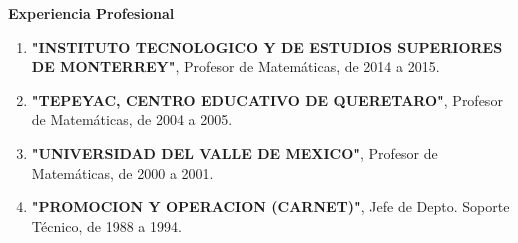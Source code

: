 \textbf{Experiencia Profesional}

\begin{enumerate}

\item \textbf{"INSTITUTO TECNOLOGICO Y DE ESTUDIOS SUPERIORES DE MONTERREY"}, Profesor de Matemáticas, de 2014 a 2015.

\item \textbf{"TEPEYAC, CENTRO EDUCATIVO DE QUERETARO"}, Profesor de Matemáticas, de 2004 a 2005.

\item \textbf{"UNIVERSIDAD DEL VALLE DE MEXICO"}, Profesor de Matemáticas, de 2000 a 2001.

\item \textbf{"PROMOCION Y OPERACION (CARNET)"}, Jefe de Depto. Soporte Técnico, de 1988 a 1994.

\end{enumerate}
